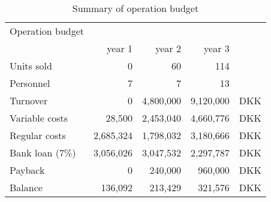 \begin{table}[h!]
\centering
\begin{tabular}{l r r r r}
Operation budget      &            &              &             &    \\
                      & year 1     & year 2       & year 3      &    \\
\hline                                                               
Units sold            &          0 &        60   &         114  &    \\
Personnel             &          7 &         7   &          13  &    \\ 
\hline                                              
Turnover              &          0 & 4,800,000   &   9,120,000  & DKK\\
Variable costs        &     28,500 & 2,453,040   &   4,660,776  & DKK\\
Regular costs         &  2,685,324 & 1,798,032   &   3,180,666  & DKK\\
Bank loan (7\%)       &  3,056,026 & 3,047,532   &   2,297,787  & DKK\\
Payback               &          0 &   240,000   &     960,000  & DKK\\
Balance               &    136,092 &   213,429   &     321,576  & DKK\\  
\end{tabular}
\caption{Summary of operation budget}
\label{opebud}
\end{table}

